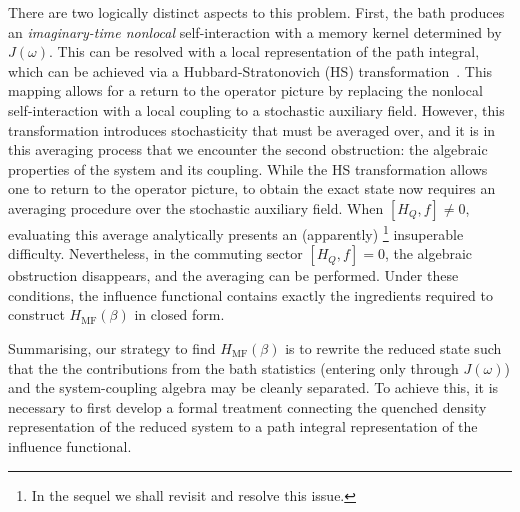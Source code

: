 There are two logically distinct aspects to this problem. First, the bath produces an \emph{imaginary-time nonlocal} self-interaction with a memory kernel determined by $J(\omega)$. This can be resolved with a local representation of the path integral, which can be achieved via a Hubbard-Stratonovich (HS) transformation~\cite{hubbardCalculationPartitionFunctions1959a, stratonovich1957QDistro}. This mapping allows for a return to the operator picture by replacing the nonlocal self-interaction with a local coupling to a stochastic auxiliary field. However, this transformation introduces stochasticity that must be averaged over, and it is in this averaging process that we encounter the second obstruction: the algebraic properties of the system and its coupling. While the HS transformation allows one to return to the operator picture, to obtain the exact state now requires an averaging procedure over the stochastic auxiliary field. When $[H_Q,f]\neq 0$, evaluating this average analytically presents an (apparently) \footnote{In the sequel we shall revisit and resolve this issue.} insuperable difficulty. Nevertheless, in the commuting sector $[H_Q,f]=0$, the algebraic obstruction disappears, and the averaging can be performed. Under these conditions, the influence functional contains exactly the ingredients required to construct $H_{\mathrm{MF}}(\beta)$ in closed form.

Summarising, our strategy to find $H_{\mathrm{MF}}(\beta)$ is to rewrite the reduced state such that the the contributions from the bath statistics (entering only through $J(\omega)$) and the system-coupling algebra may be cleanly separated. To achieve this, it is necessary to first develop a formal treatment connecting the quenched density representation of the reduced system to a path integral representation of the influence functional. 


